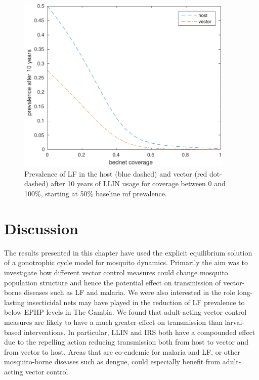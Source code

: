 \begin{figure}[h!]
\begin{center}
\includegraphics[height=8.5cm]{Project/Figures/VectorModel/LF/10yearprev_1950s_bednets.pdf} 
\caption{Prevalence of LF in the host (blue dashed) and vector (red dot-dashed) after 10 years of LLIN usage for coverage between 0 and 100\%, starting at 50\% baseline mf prevalence.}
\label{fig:10yrLLIN}
\end{center}
\end{figure} 

\FloatBarrier

\section{Discussion}

The results presented in this chapter have used the explicit equilibrium solution of a gonotrophic cycle model for mosquito dynamics. Primarily the aim was to investigate how different vector control measures could change mosquito population structure and hence the potential effect on transmission of vector-borne diseases such as LF and malaria. We were also interested in the role long-lasting insecticidal nets may have played in the reduction of LF prevalence to below EPHP levels in The Gambia. We found that adult-acting vector control measures are likely to have a much greater effect on transmission than larval-based interventions. In particular, LLIN and IRS both have a compounded effect due to the repelling action reducing transmission both from host to vector and from vector to host. Areas that are co-endemic for malaria and LF, or other mosquito-borne diseases such as dengue, could especially benefit from adult-acting vector control. 

